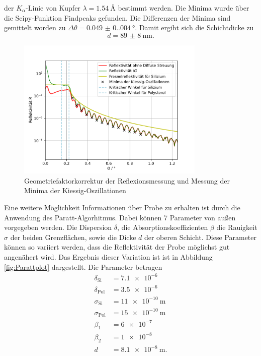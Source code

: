 der $K_{\alpha}$-Linie von Kupfer $\lambda=\SI{1.54}{\angstrom}$ bestimmt werden.\cite{m-tolan2013}
Die Minima wurde über die Scipy-Funktion Findpeaks gefunden. Die Differenzen der Minima sind gemittelt worden zu $\Delta \theta = \SI{0.049(0.004)}{\degree}$.
Damit ergibt sich die Schichtdicke zu 
\begin{equation*}
    d = \SI{89(8)}{\nano\meter}.
\end{equation*}
\begin{figure}[H]
    \centering
    \includegraphics[width=0.8\textwidth]{plots/KorrigierteReflektionsmessung.pdf}
    \caption{Geometriefaktorkorrektur der Reflexionsmessung und Messung der Minima der Kiessig-Oszillationen}
    \label{fig:KorrigierteReflektionsmessung}
\end{figure}
Eine weitere Möglichkeit Informationen über Probe zu erhalten ist durch die Anwendung des Paratt-Algorhitmus. Dabei können 7 Parameter von außen vorgegeben werden. 
Die Dispersion $\delta$, die Absorptionskoeffizienten $\beta$ die Rauigkeit $\sigma$ der beiden Grenzflächen, sowie die Dicke $d$ der oberen Schicht.
Diese Parameter können so variiert werden, dass die Reflektivität der Probe möglichst gut angenähert wird. Das Ergebnis dieser Variation ist ist in Abbildung 
\ref{fig:Parattplot} dargestellt. Die Parameter betragen
\begin{align*}
    \delta_{\text{Si}} &= \SI{7.1e-6}{} \\
    \delta_{\text{Pol}} &= \SI{3.5e-6}{} \\
    \sigma_{\text{Si}} &= \SI{11e-10}{\meter} \\
    \sigma_{\text{Pol}} &= \SI{15e-10}{\meter} \\
    \beta_1 &= \SI{6e-7}{} \\
    \beta_2 &= \SI{1e-8}{} \\
    d &= \SI{8.1e-8}{\meter}.
\end{align*}
